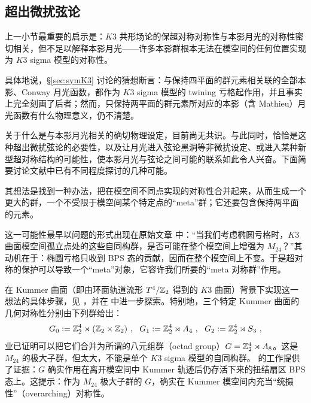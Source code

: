 
\subsection{超出微扰弦论}
\label{subsec:phys_Other directions}

上一小节最重要的启示是：$K3$ 共形场论的保超对称对称性与本影月光的对称性密切相关，但不足以解释本影月光——许多本影群根本无法在模空间的任何位置实现为 $K3$ sigma 模型的对称性。

具体地说，\S\ref{sec:symK3} 讨论的猜想断言：与保持四平面的群元素相关联的全部本影、Conway 月光函数，都作为 $K3$ sigma 模型的 twining 亏格起作用，并且事实上完全刻画了后者；然而，只保持两平面的群元素所对应的本影（含 Mathieu）月光函数有什么物理意义，仍不清楚。


关于什么是与本影月光相关的确切物理设定，目前尚无共识。与此同时，恰恰是这种超出微扰弦论的必要性，以及让月光进入弦论黑洞等非微扰设定、或进入某种新型超对称结构的可能性，使本影月光与弦论之间可能的联系如此令人兴奋。下面简要讨论文献中已有不同程度探讨的几种可能。

 其想法是找到一种办法，把在模空间不同点实现的对称性合并起来，从而生成一个更大的群，一个不受限于模空间某个特定点的“meta”群；它还要包含保持两平面的元素。

这一可能性最早以问题的形式出现在原始文章 \cite{Eguchi2010} 中：“当我们考虑椭圆亏格时，$K3$ 曲面模空间孤立点处的这些自同构群，是否可能在整个模空间上增强为 $M_{24}$？”其动机在于：椭圆亏格只收到 BPS 态的贡献，因而在整个模空间上不变。于是超对称的保护可以导致一个“meta”对象，它容许我们所要的“meta 对称群”作用。


在 Kummer 曲面（即由环面轨道流形 $T^4/\mathbb{Z}_2$ 得到的 $K3$ 曲面）背景下实现这一想法的具体步骤，见 \cite{Taormina:2011rr,Taormina:2013mda,cheng2015landau}，并在 \cite{GaberdielMatthiasR2017Mmas} 中进一步探索。特别地，三个特定 Kummer 曲面的几何对称性分别由下列群给出：
\begin{equation}
G_0:=\mathbb{Z}_2^4\rtimes(\mathbb{Z}_2\times\mathbb{Z}_2)~,~~G_1:=\mathbb{Z}_2^4\rtimes A_4~,~~G_2:=\mathbb{Z}_2^4\rtimes S_3~, 
\end{equation}
业已证明可以把它们合并为所谓的八元组群（octad group）$G=\mathbb{Z}_2^4\rtimes A_8$。这是 $M_{24}$ 的极大子群，但太大，不能是单个 $K3$ sigma 模型的自同构群。\cite{GaberdielMatthiasR2017Mmas} 的工作提供了证据：$G$ 确实作用在离开模空间中 Kummer 轨迹后仍存活下来的扭结扇区 BPS 态上。这提示：作为 $M_{24}$ 极大子群的 $G$，确实在 Kummer 模空间内充当“统摄性”（overarching）对称性。

